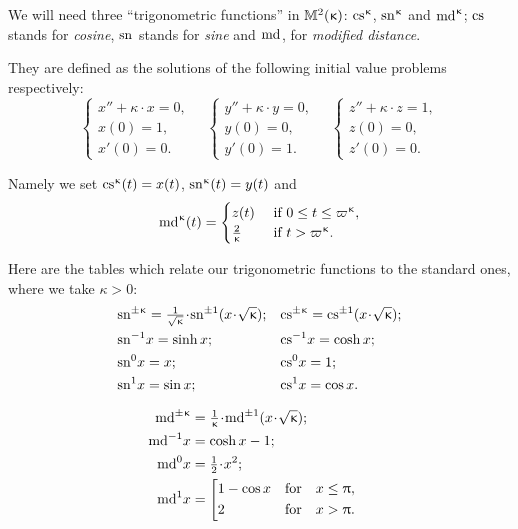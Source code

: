 We will need three ``trigonometric functions'' in $\mathbb{M}_{{}}^{2}({\upkappa})$: $\cs\kappa$, $\sn\kappa$ and $\md\kappa$;
$\mathrm{cs}^{}$ stands for {}\emph{cosine}, $\mathrm{sn}^{}$ stands for {}\emph{sine} and $\mathrm{md}^{}$, for {}\emph{modified distance}. 

They are defined as the solutions of the following initial value problems respectively:
\[
\begin{cases}
 x''+\kappa\cdot x=0,\\
 x(0)=1,\\
 x'(0)=0.
 \end{cases} 
  \quad 
 \begin{cases}
 y''+\kappa\cdot y=0,\\
 y(0)=0,\\
 y'(0)=1.
 \end{cases} 
\quad
 \begin{cases}
 z''+\kappa\cdot z=1,\\
 z(0)=0,\\
 z'(0)=0.
 \end{cases}  
\]

Namely we set $\mathrm{cs}^{\upkappa}(t)=x(t)$, $\mathrm{sn}^{\upkappa}(t)=y(t)$ and 
\[
\md\kappa(t)=
\begin{cases}
z(t)& \textrm{ if } 0\le t\le \varpi\kappa,
\\
\tfrac{2}{\kappa}& \textrm{ if  } t> \varpi\kappa.
\end{cases}
\]

Here are the tables which relate our trigonometric functions to the standard ones, where 
we take $\kappa>0$:\index{$\md\kappa$}\index{$\sn\kappa$}\index{$\cs\kappa$}
\begin{align*}
&\sn{\pm\kappa}=\tfrac{1}{\sqrt{\kappa}}\cdot \sn{\pm1}({x}\cdot {\sqrt{\kappa}});
&&\cs{\pm\kappa}=\cs{\pm1}({x}\cdot {\sqrt{\kappa}});
\\
&\sn{-1} x=\sinh x;&&\cs{-1} x=\cosh x;\\
&\sn{0} x=x;
&&\cs{0} x=1;\\
&\sn{1} x=\sin x;	&&\cs{1} x= \cos x.
\end{align*}
	
\begin{align*}
\md{\pm\kappa}
&=
\tfrac{1}{\kappa}\cdot \md{\pm1}({x}\cdot {\sqrt{\kappa}});
\\
\md{-1} x&=\cosh x-1;
\\
\md{0} x&=\tfrac{1}{2}\cdot x^2; 
\\
\md{1} x
&=
\left[
\begin{aligned}
&1-\cos x&&\text{for}&&x\le \pi,
\\
&2&&\text{for}&&x >\pi.
\end{aligned}
\right.	&
\end{align*}

